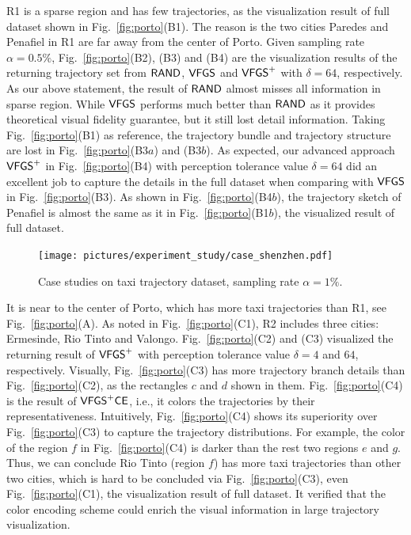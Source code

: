 R1 is a sparse region and has few trajectories, as the visualization result of full \pt{} dataset shown in Fig.~\ref{fig:porto}(B1).
The reason is the two cities Paredes and Penafiel in R1 are far away from the center of Porto.
Given sampling rate $\alpha=0.5\%$, Fig.~\ref{fig:porto}(B2), (B3) and (B4) are the visualization results of the returning trajectory set from $\mathsf{RAND}{}$, $\mathsf{VFGS}$ and $\mathsf{VFGS}^{+}$ with $\delta=64$, respectively.
As our above statement, the result of $\mathsf{RAND}$ almost misses all information in sparse region.
While $\mathsf{VFGS}$ performs much better than $\mathsf{RAND}$ as it provides theoretical visual fidelity guarantee, but it still lost detail information.
Taking Fig.~\ref{fig:porto}(B1) as reference, the trajectory bundle and trajectory structure are lost in Fig.~\ref{fig:porto}(B3$a$) and (B3$b$).
As expected, our advanced approach $\mathsf{VFGS}^{+}$ in Fig.~\ref{fig:porto}(B4) with perception tolerance value $\delta=64$ did an excellent job to capture the details in the full dataset when comparing with $\mathsf{VFGS}$ in Fig.~\ref{fig:porto}(B3).
As shown in Fig.~\ref{fig:porto}(B4$b$), the trajectory sketch of Penafiel is almost the same as it in Fig.~\ref{fig:porto}(B1$b$), the visualized result of full dataset.


\begin{figure}[t]
	\centering
	\texttt{[image: pictures/experiment\_study/case\_shenzhen.pdf]}
	\vspace{-4mm}
	\caption{Case studies on \sz{} taxi trajectory dataset, sampling rate $\alpha = 1\%$.}
	\label{fig:shenzhen}
    \vspace{-3mm}
\end{figure}

 It is near to the center of Porto, which has more taxi trajectories than R1, see Fig.~\ref{fig:porto}(A).
As noted in Fig.~\ref{fig:porto}(C1), R2 includes three cities: Ermesinde, Rio Tinto and Valongo.
Fig.~\ref{fig:porto}(C2) and (C3) visualized the returning result of $\mathsf{VFGS}^{+}$ with perception tolerance value $\delta=4$ and $64$, respectively.
Visually, Fig.~\ref{fig:porto}(C3) has more trajectory branch details than Fig.~\ref{fig:porto}(C2), as the rectangles $c$ and $d$ shown in them.
Fig.~\ref{fig:porto}(C4) is the result of $\mathsf{VFGS}^{+}\mathsf{CE}$, i.e., it colors the trajectories by their representativeness.
Intuitively, Fig.~\ref{fig:porto}(C4) shows its superiority over Fig.~\ref{fig:porto}(C3) to capture the trajectory distributions.
For example, the color of the region $f$ in Fig.~\ref{fig:porto}(C4) is {darker} than the rest two regions $e$ and $g$.
Thus, we can conclude Rio Tinto (region $f$) has more taxi trajectories than other two cities, which is hard to be concluded via Fig.~\ref{fig:porto}(C3), even Fig.~\ref{fig:porto}(C1), the visualization result of full dataset.
It verified that the color encoding scheme could enrich the visual information in large trajectory visualization.

